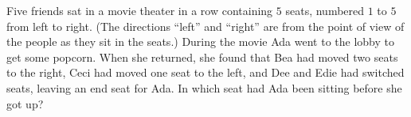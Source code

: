 Five friends sat in a movie theater in a row containing $5$ seats, numbered $1$ to $5$ from left to right. (The directions ``left'' and ``right'' are from the point of view of the people as they sit in the seats.) During the movie Ada went to the lobby to get some popcorn. When she returned, she found that Bea had moved two seats to the right, Ceci had moved one seat to the left, and Dee and Edie had switched seats, leaving an end seat for Ada. In which seat had Ada been sitting before she got up?
